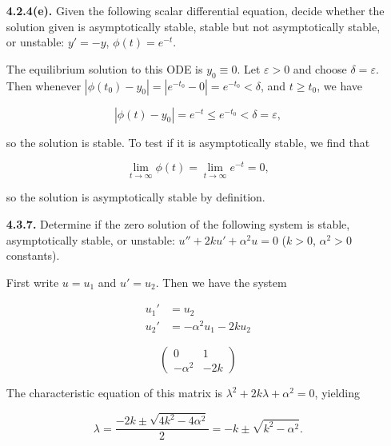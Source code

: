 \documentclass[11pt,oneside,english]{amsart}
\theoremstyle{definition}
\newcommand{\lom}[2]{\lim_{{#1}\rightarrow{#2}}}
\newcommand{\ve}{\varepsilon}
\begin{document}
\rightline{\today}



\vspace{1cm}
\begin{enumerate}





\item[\textbf{4.2.4(e).}] Given the following scalar differential equation, decide whether the solution given is asymptotically stable, stable but not asymptotically stable, or unstable: $y'=-y$, $\phi(t)=e^{-t}$.


The equilibrium solution to this ODE is $y_0\equiv 0$. Let $\ve>0$ and choose $\delta=\ve$. Then whenever $|\phi(t_0)-y_0|=|e^{-t_0}-0|=e^{-t_0}<\delta$, and $t\geq t_0$, we have

\[
|\phi(t)-y_0|=e^{-t}\leq e^{-t_0}<\delta=\ve,
\]

so the solution is stable. To test if it is asymptotically stable, we find that

\[
\lom{t}{\infty}\phi(t)=\lom{t}{\infty}e^{-t}=0,
\]

so the solution is asymptotically stable by definition.

\vfill
\pagebreak

\item[\textbf{4.3.7.}] Determine if the zero solution of the following system is stable, asymptotically stable, or unstable: $u''+2ku'+\alpha^2 u=0$ ($k>0$, $\alpha^2>0$ constants).

First write $u=u_1$ and $u'=u_2$. Then we have the system

\begin{multicols}{2}
\begin{align*}
u_1'&=u_2\\[2mm]
u_2'&=-\alpha^2u_1-2ku_2
\end{align*}


\[\begin{pmatrix}
0 & 1\\
-\alpha^2 & -2k
\end{pmatrix}\]

\end{multicols}
The characteristic equation of this matrix is $\lambda^2 +2k\lambda+\alpha^2=0$, yielding

\[
\lambda=\frac{-2k\pm\sqrt{4k^2-4\alpha^2}}{2}=-k\pm\sqrt{k^2-\alpha^2}.
\]


\end{enumerate}
\end{document}
